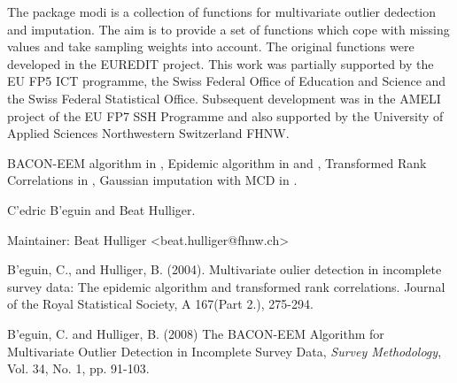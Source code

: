 %
\begin{Description}\relax
The package modi is a collection of functions for multivariate outlier dedection and imputation. 
The aim is to provide a set of functions which cope with missing values and take sampling weights into account. 
The original functions were 
developed in the EUREDIT project. This work was partially supported by the EU FP5 ICT programme, 
the Swiss Federal Office of Education and Science and the Swiss Federal Statistical Office. 
Subsequent development was in the AMELI project of the EU FP7 SSH Programme and also supported by the 
University of Applied Sciences Northwestern Switzerland FHNW. 
\end{Description}
%
\begin{Details}\relax


BACON-EEM algorithm in , Epidemic algorithm in  and , Transformed Rank Correlations in , Gaussian imputation with MCD in .  
\end{Details}
%
\begin{Author}\relax
C\bsl{}'edric B\bsl{}'eguin and Beat Hulliger.

Maintainer: Beat Hulliger <beat.hulliger@fhnw.ch>

\end{Author}
%
\begin{References}\relax
B\bsl{}'eguin, C., and Hulliger, B. (2004). Multivariate oulier detection in
incomplete survey data: The epidemic algorithm and transformed
rank correlations. Journal of the Royal Statistical Society, A
167(Part 2.), 275-294.

B\bsl{}'eguin, C. and Hulliger, B. (2008) The BACON-EEM Algorithm for Multivariate Outlier Detection 
in Incomplete Survey Data, \emph{Survey Methodology}, Vol. 34, No. 1, pp. 91-103.
\end{References}
